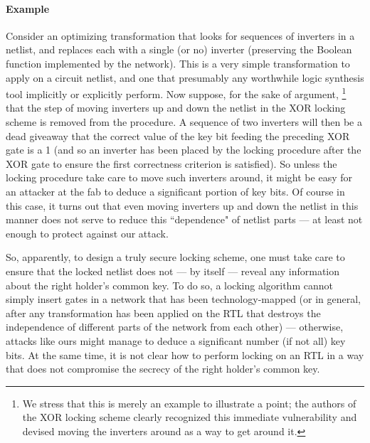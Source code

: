 \paragraph{Example} Consider an optimizing transformation that looks for sequences of inverters in a netlist, and replaces each with a single (or no) inverter (preserving the Boolean function implemented by the network). This is a very simple transformation to apply on a circuit netlist, and one that presumably any worthwhile logic synthesis tool implicitly or explicitly perform. Now suppose, for the sake of argument, \footnote{We stress that this is merely an example to illustrate a point; the authors of the XOR locking scheme clearly recognized this immediate vulnerability and devised moving the inverters around as a way to get around it.
} that the step of moving inverters up and down the netlist in the XOR locking scheme is removed from the procedure. A sequence of two inverters will then be a dead giveaway that the correct value of the key bit feeding the preceding XOR gate is a 1 (and so an inverter has been placed by the locking procedure after the XOR gate to ensure the first correctness criterion is satisfied). So unless the locking procedure take care to move such inverters around, it might be easy for an attacker at the fab to deduce a significant portion of key bits. Of course in this case, it turns out that even moving inverters up and down the netlist in this manner does not serve to reduce this ``dependence" of netlist parts --- at least not enough to protect against our attack.

So, apparently, to design a truly secure locking scheme, one must take care to ensure that the locked netlist does not --- by itself --- reveal any information about the right holder's common key. To do so, a locking algorithm cannot simply insert gates in a network that has been technology-mapped (or in general, after any transformation has been applied on the RTL that destroys the independence of different parts of the network from each other) --- otherwise, attacks like ours might manage to deduce a significant number (if not all) key bits. At the same time, it is not clear how to perform locking on an RTL in a way that does not compromise the secrecy of the right holder's common key.



